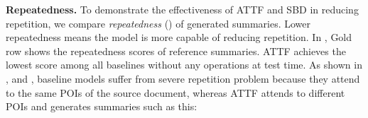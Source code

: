 \textbf{Repeatedness.}
To demonstrate the effectiveness of ATTF and SBD in reducing repetition, 
we compare \textit{repeatedness} () 
of generated summaries.
Lower repeatedness 
means the model is more capable of reducing repetition.
In , Gold row shows the repeatedness scores of
reference summaries. ATTF achieves the lowest
score among all baselines without any operations at test time. 
As shown in ,  and ,
baseline models suffer from severe repetition problem because they attend to the same POIs 
of the source document, whereas 
ATTF attends to different POIs and generates summaries 
such as this:


